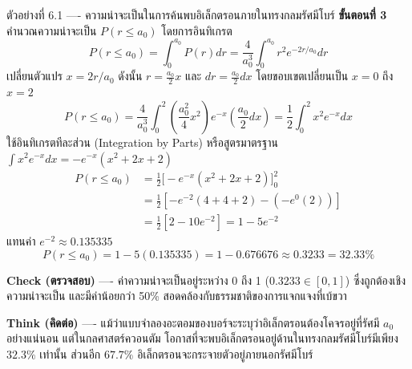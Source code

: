 \begin{psctbox}{ตัวอย่างที่ 6.1 ---- ความน่าจะเป็นในการค้นพบอิเล็กตรอนภายในทรงกลมรัศมีโบร์}
\textbf{ขั้นตอนที่ 3} คำนวณความน่าจะเป็น $P(r \le a_0)$ โดยการอินทิเกรต
\begin{equation*}
P(r \le a_0) = \int_0^{a_0} P(r) dr = \frac{4}{a_0^3} \int_0^{a_0} r^2 e^{-2r/a_0} dr
\end{equation*}
เปลี่ยนตัวแปร $x = 2r/a_0$ ดังนั้น $r = \frac{a_0}{2} x$ และ $dr = \frac{a_0}{2} dx$ โดยขอบเขตเปลี่ยนเป็น $x = 0$ ถึง $x = 2$
\begin{equation*}
P(r \le a_0) = \frac{4}{a_0^3} \int_0^2 \left(\frac{a_0^2}{4} x^2\right) e^{-x} \left(\frac{a_0}{2} dx\right) = \frac{1}{2} \int_0^2 x^2 e^{-x} dx
\end{equation*}
ใช้อินทิเกรตทีละส่วน (Integration by Parts) หรือสูตรมาตรฐาน $\int x^2 e^{-x} dx = -e^{-x}(x^2 + 2x + 2)$
\begin{align*}
P(r \le a_0) &= \frac{1}{2} \Big[ -e^{-x}(x^2 + 2x + 2) \Big]_0^2 \\
&= \frac{1}{2} \left[ -e^{-2}(4 + 4 + 2) - (-e^0(2)) \right] \\
&= \frac{1}{2} \left[ 2 - 10 e^{-2} \right] = 1 - 5 e^{-2}
\end{align*}
แทนค่า $e^{-2} \approx 0.135335$
\begin{equation*}
P(r \le a_0) = 1 - 5(0.135335) = 1 - 0.676676 \approx 0.3233 = 32.33\%
\end{equation*}

\textbf{Check (ตรวจสอบ)} ---- ค่าความน่าจะเป็นอยู่ระหว่าง 0 ถึง 1 ($0.3233 \in [0, 1]$) ซึ่งถูกต้องเชิงความน่าจะเป็น และมีค่าน้อยกว่า 50\% สอดคล้องกับธรรมชาติของการแจกแจงที่เบ้ขวา

\textbf{Think (คิดต่อ)} ---- แม้ว่าแบบจำลองอะตอมของบอร์จะระบุว่าอิเล็กตรอนต้องโคจรอยู่ที่รัศมี $a_0$ อย่างแน่นอน แต่ในกลศาสตร์ควอนตัม โอกาสที่จะพบอิเล็กตรอนอยู่ด้านในทรงกลมรัศมีโบร์มีเพียง $32.3\%$ เท่านั้น ส่วนอีก $67.7\%$ อิเล็กตรอนจะกระจายตัวอยู่ภายนอกรัศมีโบร์
\end{psctbox}

